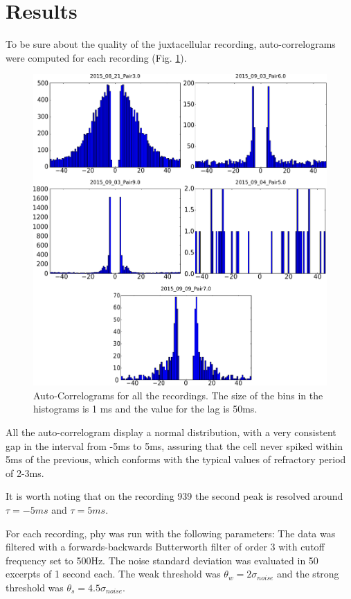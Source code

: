 \documentclass{article}
\begin{document}
\section{Results}
To be sure about the quality of the juxtacellular recording, auto-correlograms were computed for each recording (Fig. \ref{fig:AC}).
\begin{figure}[!h]
	\centering
	\includegraphics[width=\linewidth]{AC.pdf}
	\caption{Auto-Correlograms for all the recordings. The size of the bins in the histograms is 1 ms and the value for the lag is 50ms.
}
\label{fig:AC}
\end{figure}

All the auto-correlogram display a normal distribution, with a very consistent gap in the interval from -5ms to 5ms, assuring that the cell never spiked within 5ms of the previous, which conforms with the typical values of refractory period of 2-3ms.

It is worth noting that on the recording 939 the second peak is resolved around $\tau = -5 ms$ and $\tau = 5 ms$.

For each recording, phy was run with the following parameters:
The data was filtered with a forwards-backwards Butterworth filter of order 3 with cutoff frequency set to 500Hz. The noise standard deviation was evaluated in 50 excerpts of 1 second each. The weak threshold was $\theta_w = 2 \sigma_{noise}$ and the strong threshold was $\theta_s = 4.5 \sigma_{noise}$.
\end{document}
